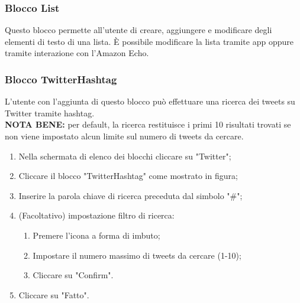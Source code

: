 \subsubsection{Blocco List}
Questo blocco permette all'utente di creare, aggiungere e modificare degli elementi di testo di una lista.
È possibile modificare la lista tramite app oppure tramite interazione con l'Amazon Echo.

\subsubsection{Blocco TwitterHashtag} \label{twitterHa}
L'utente con l'aggiunta di questo blocco può effettuare una ricerca dei tweets su Twitter tramite hashtag. \\
\textbf{NOTA BENE:} per default, la ricerca restituisce i primi 10 risultati trovati se non viene impostato alcun limite sul numero di tweets da cercare.
\begin{enumerate}
	\item Nella schermata di elenco dei blocchi cliccare su "Twitter";
	\item Cliccare il blocco "TwitterHashtag" come mostrato in figura;
	\item Inserire la parola chiave di ricerca preceduta dal simbolo "\#";
	\item (Facoltativo) impostazione filtro di ricerca:
	\begin{enumerate}
		\item Premere l'icona a forma di imbuto;
		\item Impostare il numero massimo di tweets da cercare (1-10);
		\item Cliccare su "Confirm".
	\end{enumerate}
	\item Cliccare su "Fatto".
\end{enumerate}

